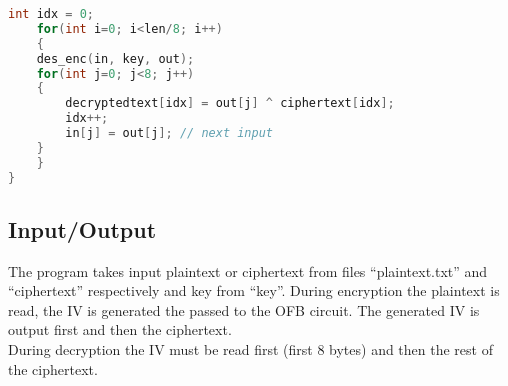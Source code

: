 \documentclass{article}
\begin{document}
\begin{lstlisting}[language=c]
    int idx = 0;
    for(int i=0; i<len/8; i++)
    {
	des_enc(in, key, out);
	for(int j=0; j<8; j++)
	{
	    decryptedtext[idx] = out[j] ^ ciphertext[idx];
	    idx++;
	    in[j] = out[j]; // next input
	}
    }
}
\end{lstlisting}


\subsection{Input/Output}
The program takes input plaintext or ciphertext from files ``plaintext.txt'' and ``ciphertext'' respectively and key from ``key''. During encryption the plaintext is read, the IV is generated the passed to the OFB circuit. The generated IV is output first and then the ciphertext.\\
During decryption the IV must be read first (first 8 bytes) and then the rest of the ciphertext.
\end{document}
